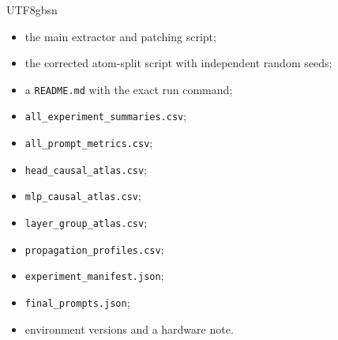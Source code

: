 \documentclass[11pt]{article}
\providecommand{\tightlist}{\setlength{\itemsep}{0pt}\setlength{\parskip}{0pt}}
\begin{document}
\begin{CJK*}{UTF8}{gbsn}
\begin{itemize}
\tightlist
\item
  the main extractor and patching script;
\item
  the corrected atom-split script with independent random seeds;
\item
  a \texttt{README.md} with the exact run command;
\item
  \texttt{all\_experiment\_summaries.csv};
\item
  \texttt{all\_prompt\_metrics.csv};
\item
  \texttt{head\_causal\_atlas.csv};
\item
  \texttt{mlp\_causal\_atlas.csv};
\item
  \texttt{layer\_group\_atlas.csv};
\item
  \texttt{propagation\_profiles.csv};
\item
  \texttt{experiment\_manifest.json};
\item
  \texttt{final\_prompts.json};
\item
  environment versions and a hardware note.
\end{itemize}


\nocite{*}


\end{CJK*}
\end{document}
